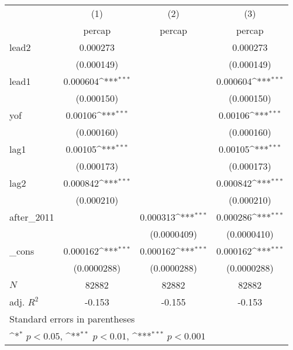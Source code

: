 {
\def\sym#1{\ifmmode^{#1}\else\(^{#1}\)\fi}
\begin{tabular}{l*{3}{c}}
\hline\hline
            &\multicolumn{1}{c}{(1)}&\multicolumn{1}{c}{(2)}&\multicolumn{1}{c}{(3)}\\
            &\multicolumn{1}{c}{percap}&\multicolumn{1}{c}{percap}&\multicolumn{1}{c}{percap}\\
\hline
lead2       &    0.000273         &                     &    0.000273         \\
            &  (0.000149)         &                     &  (0.000149)         \\
[1em]
lead1       &    0.000604\sym{***}&                     &    0.000604\sym{***}\\
            &  (0.000150)         &                     &  (0.000150)         \\
[1em]
yof         &     0.00106\sym{***}&                     &     0.00106\sym{***}\\
            &  (0.000160)         &                     &  (0.000160)         \\
[1em]
lag1        &     0.00105\sym{***}&                     &     0.00105\sym{***}\\
            &  (0.000173)         &                     &  (0.000173)         \\
[1em]
lag2        &    0.000842\sym{***}&                     &    0.000842\sym{***}\\
            &  (0.000210)         &                     &  (0.000210)         \\
[1em]
after\_2011  &                     &    0.000313\sym{***}&    0.000286\sym{***}\\
            &                     & (0.0000409)         & (0.0000410)         \\
[1em]
\_cons      &    0.000162\sym{***}&    0.000162\sym{***}&    0.000162\sym{***}\\
            & (0.0000288)         & (0.0000288)         & (0.0000288)         \\
\hline
\(N\)       &       82882         &       82882         &       82882         \\
adj. \(R^{2}\)&      -0.153         &      -0.155         &      -0.153         \\
\hline\hline
\multicolumn{4}{l}{\footnotesize Standard errors in parentheses}\\
\multicolumn{4}{l}{\footnotesize \sym{*} \(p<0.05\), \sym{**} \(p<0.01\), \sym{***} \(p<0.001\)}\\
\end{tabular}
}
